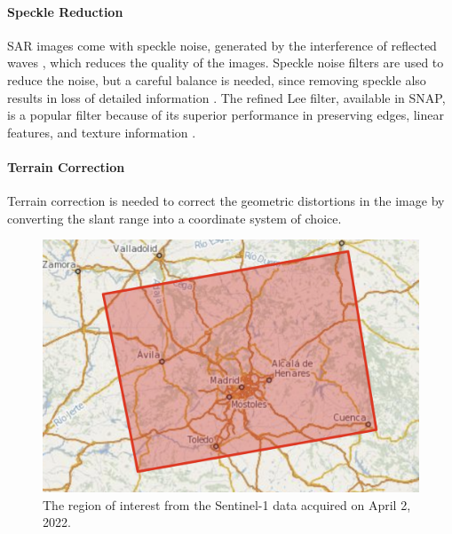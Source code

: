 \documentclass[conference]{IEEEtran}
\begin{document}
	\paragraph{Speckle Reduction}
	SAR images come with speckle noise, generated by the interference of reflected waves \cite{Filipponi_2019}, which reduces the quality of the images.
	Speckle noise filters are used to reduce the noise, but a careful balance is needed, since removing speckle also results in loss of detailed information \cite{Yommy_2015}. 
	The refined Lee filter, available in SNAP, is a popular filter because of its superior performance in preserving edges, linear features, and texture information \cite{Filipponi_2019}.
	
	\paragraph{Terrain Correction}
	Terrain correction is needed to correct the geometric distortions in the image by converting the slant range into a coordinate system of choice.



	\begin{figure}[htbp]
		\centerline{\includegraphics[scale=0.25]{Images/Madrid_SLC_IW_Data.PNG}}
		\caption{The region of interest from the Sentinel-1 data acquired on April 2, 2022.}
		\label{img:Madrid_SLC_IW_Data}
	\end{figure}
\end{document}
